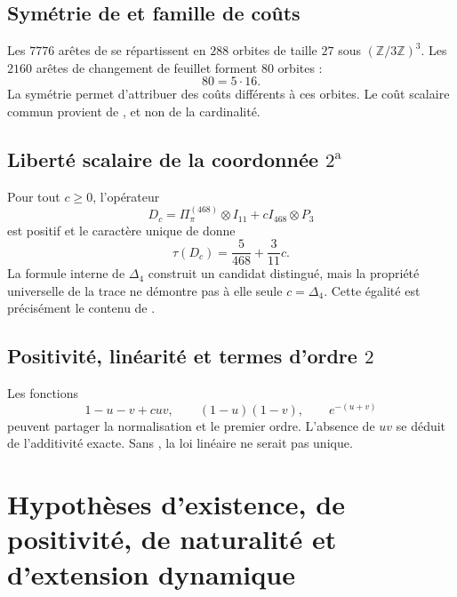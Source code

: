 \subsection{Symétrie de \texorpdfstring{\Gtr}{Gamma tr} et famille de coûts}

Les \(7776\) arêtes de \Gtr se répartissent en \(288\) orbites de taille
\(27\) sous \((\mathbb Z/3\mathbb Z)^3\). Les \(2160\) arêtes de
changement de feuillet forment \(80\) orbites :
\[
 80=5\cdot16.
\]
La symétrie permet d’attribuer des coûts différents à ces orbites. Le coût
scalaire commun provient de \HAdd, et non de la cardinalité.

\subsection{Liberté scalaire de la coordonnée \(2^{\mathrm a}\)}

Pour tout \(c\ge0\), l’opérateur
\[
D_c=\Pi_\pi^{(468)}\otimes I_{11}
+cI_{468}\otimes P_3
\]
est positif et le caractère unique de \HAdd donne
\[
\tau(D_c)=\frac5{468}+\frac3{11}c.
\]
La formule interne de \(\Delta_4\) construit un candidat distingué, mais
la propriété universelle de la trace ne démontre pas à elle seule
\(c=\Delta_4\). Cette égalité est précisément le contenu de \HDef.

\subsection{Positivité, linéarité et termes d’ordre \(2\)}

Les fonctions
\[
 1-u-v+cuv,\qquad(1-u)(1-v),\qquad e^{-(u+v)}
\]
peuvent partager la normalisation et le premier ordre. L’absence de \(uv\) se
déduit de l’additivité exacte. Sans \HAdd, la loi linéaire ne serait pas unique.

\section{Hypothèses d’existence, de positivité, de naturalité et d’extension dynamique}

